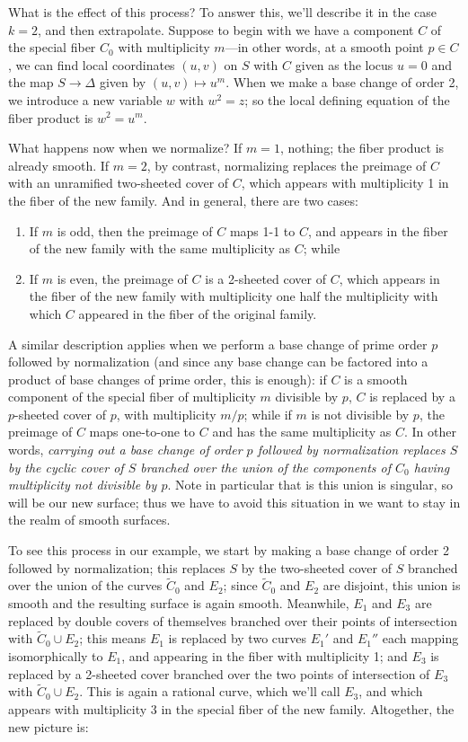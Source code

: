 What is the effect of this process? To answer this, we'll describe it in the case $k=2$, and then extrapolate. Suppose to begin with we have a component $C$ of the special fiber $C_0$ with multiplicity $m$---in other words, at a smooth point $p \in C$, we can find local coordinates $(u,v)$ on $S$ with $C$ given as the locus $u=0$ and the map $S \to \Delta$ given by $(u,v) \mapsto u^m$. When we make a base change of order 2, we introduce a new variable $w$ with $w^2 = z$; so the local defining equation of the fiber product is $w^2 = u^m$.

What happens now when we normalize? If $m = 1$, nothing; the fiber product is already smooth. If $m=2$, by contrast, normalizing replaces the preimage of $C$ with an unramified two-sheeted cover of $C$, which appears with multiplicity 1 in the fiber of the new family. And in general, there are two cases:
\begin{enumerate}
\item If $m$ is odd, then the preimage of $C$ maps 1-1 to $C$, and appears in the fiber of the new family with the same multiplicity as $C$; while
\item If $m$ is even, the preimage of $C$ is a 2-sheeted cover of $C$, which appears in the fiber of the new family with multiplicity one half the multiplicity with which $C$ appeared in the fiber of the original family.
\end{enumerate}

A similar description applies when we perform a base change of prime order $p$ followed by normalization (and since any base change can be factored into a product of base changes of prime order, this is enough): if $C$ is a smooth component of the special fiber of multiplicity $m$ divisible by $p$, $C$ is replaced by a $p$-sheeted cover of $p$, with multiplicity $m/p$; while if $m$ is not divisible by $p$, the preimage of $C$ maps one-to-one to $C$ and has the same multiplicity as $C$. In other words, \emph{carrying out a base change of order $p$ followed by normalization replaces $S$ by the cyclic cover of $S$ branched over the union of the components of $C_0$ having multiplicity not divisible by $p$}. Note in particular that is this union is singular, so will be our new surface; thus we have to avoid this situation in we want to stay in the realm of smooth surfaces.

To see this process in our example, we start by making a base change of order 2 followed by normalization; this replaces $S$ by the two-sheeted cover of $S$ branched over the union of the curves $\tilde C_0$ and $E_2$; since $\tilde C_0$ and $E_2$ are disjoint, this union is smooth and the resulting surface is again smooth. Meanwhile, $E_1$ and $E_3$ are replaced by double covers of themselves branched over their points of intersection with $\tilde C_0 \cup E_2$; this means $E_1$ is replaced by two curves $E_1'$ and $E_1''$ each mapping isomorphically to $E_1$, and appearing in the fiber with multiplicity 1; and $E_3$ is replaced by a 2-sheeted cover branched over the two points of intersection of $E_3$ with $\tilde C_0 \cup E_2$. This is again a rational curve, which we'll call $E_3$, and which appears with multiplicity 3 in the special fiber of the new family. Altogether, the new picture is:

